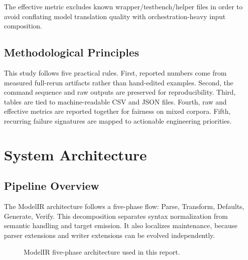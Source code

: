 \documentclass[12pt,a4paper,oneside]{report}
\begin{document}
The effective metric excludes known wrapper/testbench/helper files in order to avoid conflating model translation quality with orchestration-heavy input composition.

\section{Methodological Principles}
This study follows five practical rules. First, reported numbers come from measured full-rerun artifacts rather than hand-edited examples. Second, the command sequence and raw outputs are preserved for reproducibility. Third, tables are tied to machine-readable CSV and JSON files. Fourth, raw and effective metrics are reported together for fairness on mixed corpora. Fifth, recurring failure signatures are mapped to actionable engineering priorities.

\chapter{System Architecture}

\section{Pipeline Overview}
The ModelIR architecture follows a five-phase flow: Parse, Transform, Defaults, Generate, Verify. This decomposition separates syntax normalization from semantic handling and target emission. It also localizes maintenance, because parser extensions and writer extensions can be evolved independently.

\begin{figure}[H]
\centering
{}
\caption{ModelIR five-phase architecture used in this report.}
\label{fig:pipeline}
\end{figure}
\end{document}
